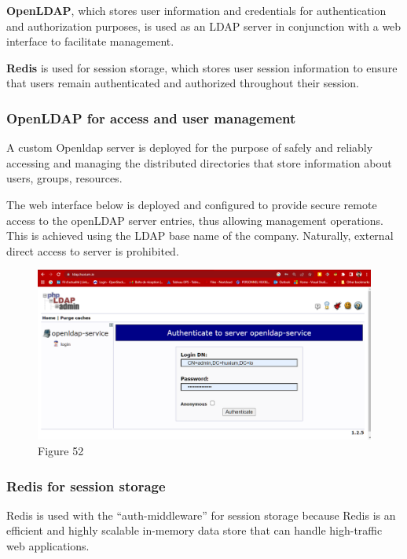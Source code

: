 \textbf{OpenLDAP}, which stores user information and credentials for authentication and authorization purposes, is used as an LDAP server in conjunction with a web interface to facilitate management. 

\textbf{Redis} is used for session storage, which stores user session information to ensure that users remain authenticated and authorized throughout their session. 

\subsubsection{OpenLDAP for access and user management  }

A custom Openldap server is deployed for the purpose of safely and reliably accessing and managing the distributed directories that store information about users, groups, resources. 

The web interface below is deployed and configured to provide secure remote access to the openLDAP server entries, thus allowing management operations. This is achieved using the LDAP base name of the company. Naturally, external direct access to server is prohibited.

\begin{figure}[H]\centering
\includegraphics[width=1.0\textwidth,angle=00]{assets/f52.png}
\caption{Figure 52 }
\label{fig:f52}
\end{figure} 

\newpage

\subsubsection{Redis for session storage }

Redis is used with the “auth-middleware” for session storage because Redis is an efficient and highly scalable in-memory data store that can handle high-traffic web applications. 

